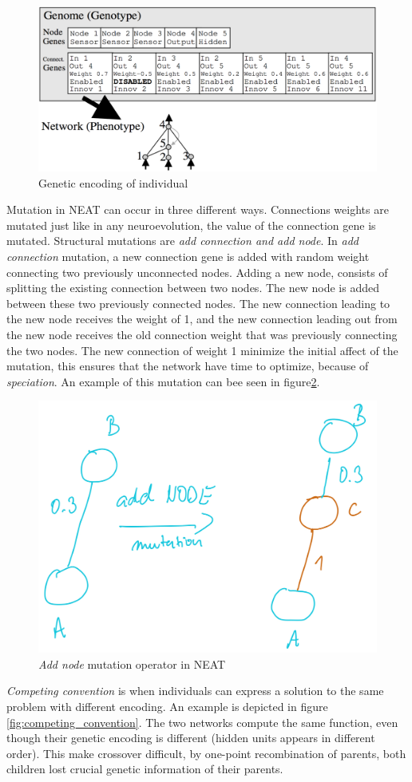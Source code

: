 \documentclass[format=acmsmall, review=false, screen=true]{acmart}
\begin{document}
\begin{figure}[H]
  \includegraphics[width=0.66\linewidth]{img/neat_encoding.PNG}
  \caption{\label{fig:genome}Genetic encoding of individual}
\end{figure}

Mutation in NEAT can occur in three different ways. Connections weights are mutated just like in any neuroevolution, the value of the connection gene is mutated. Structural mutations are \emph{add connection and add node}. In \emph{add connection} mutation, a new connection gene is added with random weight connecting two previously unconnected nodes. Adding a new node, consists of splitting the existing connection between two nodes. The new node is added between these two previously connected nodes. The new connection leading to the new node receives the weight of 1, and the new connection leading out from the new node receives the old connection weight that was previously connecting the two nodes. The new connection of weight 1 minimize the initial affect of the mutation, this ensures that the network have time to optimize, because of \emph{speciation}. An example of this mutation can bee seen in figure\ref{fig:add_node}.

\begin{figure}[H]
  \includegraphics[width=0.56\linewidth]{img/add_node.JPEG}
  \caption{\label{fig:add_node}\emph{Add node} mutation operator in NEAT}
\end{figure}

\emph{Competing convention} is when individuals can express a solution to the same problem with different encoding. An example is depicted in figure \ref{fig:competing_convention}. The two networks compute the same function, even though their genetic encoding is different (hidden units appears in different order). This make crossover difficult, by one-point recombination of parents, both children lost crucial genetic information of their parents.
\end{document}
